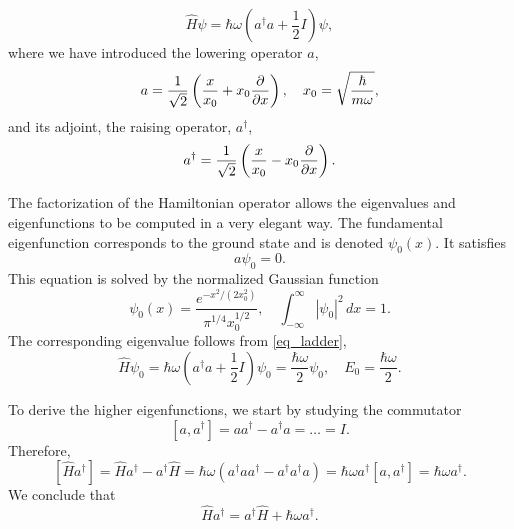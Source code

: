 \documentclass[11pt]{article}
\begin{document}
\begin{equation}\label{eq_ladder}
\hat{H}\psi = \hbar\omega\left( a^\dag a + \frac{1}{2} I\right)\psi,
\end{equation}
where we have introduced the lowering operator $a$,
\begin{equation}
  a = \frac{1}{\sqrt{2}} \left(\frac{x}{x_0} + x_0 \frac{\partial}{\partial x} \right),\quad x_0 = \sqrt{\frac{\hbar}{m\omega}},
\end{equation}
and its adjoint, the raising operator, $a^\dag$,
\begin{equation}
  a^\dag= \frac{1}{\sqrt{2}} \left(\frac{x}{x_0} - x_0 \frac{\partial}{\partial x} \right).
\end{equation}

The factorization of the Hamiltonian operator allows the eigenvalues and eigenfunctions to be
computed in a very elegant way. The fundamental eigenfunction corresponds to the ground state and is
denoted $\psi_0(x)$. It satisfies
\[
a \psi_0 = 0.
\]
This equation is solved by the normalized Gaussian function
\[
\psi_0(x) = \frac{e^{-x^2/(2 x_0^2)}}{\pi^{1/4} x_0^{1/2}},\quad \int_{-\infty}^\infty |\psi_0|^2 \,
dx = 1.
\]
The corresponding eigenvalue follows from \eqref{eq_ladder},
\[
\hat{H}\psi_0 = \hbar\omega\left( a^\dag a + \frac{1}{2}I \right)\psi_0 = \frac{\hbar\omega}{2}
\psi_0,\quad E_0 = \frac{\hbar\omega}{2}.
\]

To derive the higher eigenfunctions, we start by studying the commutator
\begin{equation}\label{eq_a-commut}
[a,a^\dag] = a a^\dag - a^\dag a = \ldots = I.
\end{equation}
Therefore,
\[
  [\hat{H}a^\dag] = \hat{H}a^\dag - a^\dag \hat{H} = \hbar\omega(a^\dag a a^\dag - a^\dag a^\dag a) =
%
  \hbar\omega a^\dag[a,a^\dag] =   \hbar\omega a^\dag.
\]
We conclude that
\begin{equation}\label{eq_comm-rel}
\hat{H} a^\dag = a^\dag \hat{H} +  \hbar\omega a^\dag.
\end{equation}
\end{document}
